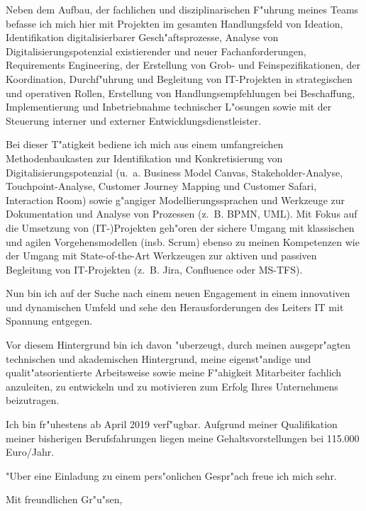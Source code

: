 \documentclass[11pt,a4paper]{dinbrief}
\begin{document}
\begin{letter}
Neben dem Aufbau, der fachlichen und disziplinarischen F"uhrung meines Teams befasse ich mich hier mit Projekten im gesamten Handlungsfeld von Ideation, Identifikation digitalisierbarer Gesch"aftsprozesse, Analyse von Digitalisierungspotenzial existierender und neuer Fachanforderungen, Requirements Engineering, der Erstellung von Grob- und Feinspezifikationen, der Koordination, Durchf"uhrung und Begleitung von IT-Projekten in strategischen und operativen Rollen, Erstellung von Handlungsempfehlungen bei Beschaffung, Implementierung und Inbetriebnahme technischer L"osungen sowie mit der Steuerung interner und externer Entwicklungsdienstleister. 

Bei dieser T"atigkeit bediene ich mich aus einem umfangreichen Methodenbaukasten zur Identifikation und Konkretisierung von Digitalisierungspotenzial (u.~a. Business Model Canvas, Stakeholder-Analyse, Touchpoint-Analyse, Customer Journey Mapping und Customer Safari, Interaction Room) sowie g"angiger Modellierungssprachen und Werkzeuge zur Dokumentation und Analyse von Prozessen (z.~B. BPMN, UML). Mit Fokus auf die Umsetzung von (IT-)Projekten geh"oren der sichere Umgang mit klassischen und agilen Vorgehensmodellen (insb. Scrum) ebenso zu meinen Kompetenzen wie der Umgang mit State-of-the-Art Werkzeugen zur aktiven und passiven Begleitung von IT-Projekten (z.~B. Jira, Confluence oder MS-TFS).

Nun bin ich auf der Suche nach einem neuen Engagement in einem innovativen und dynamischen Umfeld und sehe den Herausforderungen des  Leiters IT mit Spannung entgegen.

Vor diesem Hintergrund bin ich davon "uberzeugt, durch meinen ausgepr"agten technischen und akademischen Hintergrund, meine eigenst"andige und qualit"atsorientierte Arbeitsweise sowie meine F"ahigkeit Mitarbeiter fachlich anzuleiten, zu entwickeln und zu motivieren zum Erfolg Ihres Unternehmens beizutragen.

Ich bin fr"uhestens ab April 2019 verf"ugbar. Aufgrund meiner Qualifikation meiner bisherigen Berufsfahrungen liegen meine Gehaltsvorstellungen bei 115.000 Euro/Jahr. 

"Uber eine Einladung zu einem pers"onlichen Gespr"ach freue ich mich sehr.

\closing{Mit freundlichen Gr"u"sen,}
\end{letter}
\end{document}
